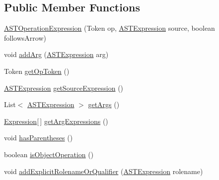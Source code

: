 \subsection*{Public Member Functions}
\begin{DoxyCompactItemize}
\item 
\hyperlink{classorg_1_1tzi_1_1use_1_1parser_1_1ocl_1_1_a_s_t_operation_expression_aa4de8c84c16dc44da72e9e46bd368dbf}{A\-S\-T\-Operation\-Expression} (Token op, \hyperlink{classorg_1_1tzi_1_1use_1_1parser_1_1ocl_1_1_a_s_t_expression}{A\-S\-T\-Expression} source, boolean follows\-Arrow)
\item 
void \hyperlink{classorg_1_1tzi_1_1use_1_1parser_1_1ocl_1_1_a_s_t_operation_expression_aa7aff741ffcb61ee8906db0fda282011}{add\-Arg} (\hyperlink{classorg_1_1tzi_1_1use_1_1parser_1_1ocl_1_1_a_s_t_expression}{A\-S\-T\-Expression} arg)
\item 
Token \hyperlink{classorg_1_1tzi_1_1use_1_1parser_1_1ocl_1_1_a_s_t_operation_expression_a7cb418d3f11684ed2160fdedec9f9624}{get\-Op\-Token} ()
\item 
\hyperlink{classorg_1_1tzi_1_1use_1_1parser_1_1ocl_1_1_a_s_t_expression}{A\-S\-T\-Expression} \hyperlink{classorg_1_1tzi_1_1use_1_1parser_1_1ocl_1_1_a_s_t_operation_expression_ac00e181d21982ae72024eb4c1b9ec047}{get\-Source\-Expression} ()
\item 
List$<$ \hyperlink{classorg_1_1tzi_1_1use_1_1parser_1_1ocl_1_1_a_s_t_expression}{A\-S\-T\-Expression} $>$ \hyperlink{classorg_1_1tzi_1_1use_1_1parser_1_1ocl_1_1_a_s_t_operation_expression_a06e3dba3634ea54c7d011598946cedcc}{get\-Args} ()
\item 
\hyperlink{classorg_1_1tzi_1_1use_1_1uml_1_1ocl_1_1expr_1_1_expression}{Expression}\mbox{[}$\,$\mbox{]} \hyperlink{classorg_1_1tzi_1_1use_1_1parser_1_1ocl_1_1_a_s_t_operation_expression_a1661b7b046b28e08787dcab505bf3245}{get\-Arg\-Expressions} ()
\item 
void \hyperlink{classorg_1_1tzi_1_1use_1_1parser_1_1ocl_1_1_a_s_t_operation_expression_acd92449ae8e3ba7a796d92d281309e1e}{has\-Parentheses} ()
\item 
boolean \hyperlink{classorg_1_1tzi_1_1use_1_1parser_1_1ocl_1_1_a_s_t_operation_expression_a824e83cacf5990ca2c9b36ce1435368e}{is\-Object\-Operation} ()
\item 
void \hyperlink{classorg_1_1tzi_1_1use_1_1parser_1_1ocl_1_1_a_s_t_operation_expression_ae880de0b17a3c48b402fa507d0e77eec}{add\-Explicit\-Rolename\-Or\-Qualifier} (\hyperlink{classorg_1_1tzi_1_1use_1_1parser_1_1ocl_1_1_a_s_t_expression}{A\-S\-T\-Expression} rolename)

\end{DoxyCompactItemize}
